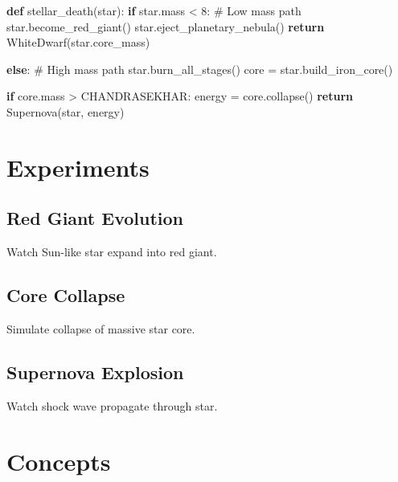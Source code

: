 \documentclass[
  11pt,
  letterpaper,
  twoside,
  openright]{book}
\newenvironment{Shaded}{\begin{snugshade}}{\end{snugshade}}
\newcommand{\CommentTok}[1]{\textcolor[rgb]{0.37,0.37,0.37}{#1}}
\newcommand{\ControlFlowTok}[1]{\textcolor[rgb]{0.00,0.23,0.31}{\textbf{#1}}}
\newcommand{\DecValTok}[1]{\textcolor[rgb]{0.68,0.00,0.00}{#1}}
\newcommand{\KeywordTok}[1]{\textcolor[rgb]{0.00,0.23,0.31}{\textbf{#1}}}
\newcommand{\NormalTok}[1]{\textcolor[rgb]{0.00,0.23,0.31}{#1}}
\newcommand{\OperatorTok}[1]{\textcolor[rgb]{0.37,0.37,0.37}{#1}}
\begin{document}
\begin{Shaded}
\begin{Highlighting}[]
\KeywordTok{def}\NormalTok{ stellar\_death(star):}
    \ControlFlowTok{if}\NormalTok{ star.mass }\OperatorTok{\textless{}} \DecValTok{8}\NormalTok{:}
        \CommentTok{\# Low mass path}
\NormalTok{        star.become\_red\_giant()}
\NormalTok{        star.eject\_planetary\_nebula()}
        \ControlFlowTok{return}\NormalTok{ WhiteDwarf(star.core\_mass)}

    \ControlFlowTok{else}\NormalTok{:}
        \CommentTok{\# High mass path}
\NormalTok{        star.burn\_all\_stages()}
\NormalTok{        core }\OperatorTok{=}\NormalTok{ star.build\_iron\_core()}

        \ControlFlowTok{if}\NormalTok{ core.mass }\OperatorTok{\textgreater{}}\NormalTok{ CHANDRASEKHAR:}
\NormalTok{            energy }\OperatorTok{=}\NormalTok{ core.collapse()}
            \ControlFlowTok{return}\NormalTok{ Supernova(star, energy)}
\end{Highlighting}
\end{Shaded}

\section{Experiments}\label{experiments-22}

\subsection{Red Giant Evolution}\label{red-giant-evolution}

Watch Sun-like star expand into red giant.

\subsection{Core Collapse}\label{core-collapse-1}

Simulate collapse of massive star core.

\subsection{Supernova Explosion}\label{supernova-explosion}

Watch shock wave propagate through star.

\section{Concepts}\label{concepts-22}
\end{document}

